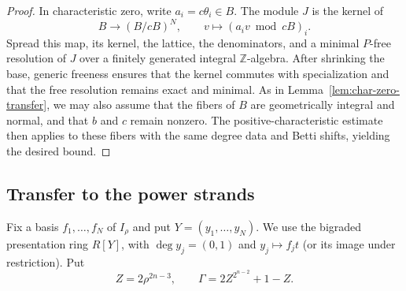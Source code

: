 \documentclass[12pt]{amsart}
\numberwithin{equation}{section}
\theoremstyle{definition}
\theoremstyle{remark}
\numberwithin{equation}{section}
\begin{document}
\begin{proof}
	In characteristic zero, write $a_i=c\theta_i\in B$. The module $J$ is the kernel of
	\[
	B\longrightarrow(B/cB)^N,\qquad
	v\longmapsto(a_iv\bmod cB)_i.
	\]
Spread this map, its kernel, the lattice, the	denominators, and a minimal $P$-free resolution of $J$ over a finitely generated integral 
$\mathbb Z$-algebra. After shrinking the base, generic freeness ensures that the kernel commutes with specialization and that the free
	resolution remains exact and minimal. As in Lemma~\ref{lem:char-zero-transfer}, we may also assume that
	the fibers of $B$ are geometrically integral and normal, and that $b$ and $c$ remain nonzero.
The positive-characteristic estimate then applies to these fibers with the same degree data and Betti shifts,
		yielding the desired bound.
	\end{proof}
	
\subsection{Transfer to the power strands}

Fix a basis $f_1,\ldots,f_N$ of $I_\rho$ and put $Y=(y_1,\ldots,y_N)$.
	We use the bigraded presentation ring $R[Y]$, with $\deg y_j=(0,1)$ and
	$y_j\mapsto f_jt$ (or its image under restriction). Put
	\[
	Z=2\rho^{2n-3},\qquad \Gamma=2Z^{2^{n-2}}+1-Z.
	\]
\end{document}
